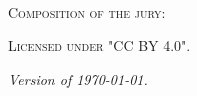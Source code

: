 \newpage
\thispagestyle{empty}
\begin{fullwidth}
	\setlength{\parindent}{0pt}
	~\vfill
	\begin{center}
		\normalfont\Large\scshape Composition of the jury:\\[1.5em]
		\normalfont
	\end{center}

	\vfill

	\par\textsc{Licensed under "CC BY 4.0".}
	\par\textit{Version of \today.}
\end{fullwidth}